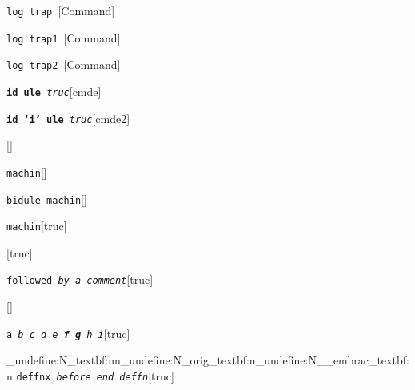 \documentclass{book}
\begin{document}
%
\noindent\texttt{log trap \EmbracOn{}\textnormal{\textsl{}}\EmbracOff{}}\hfill[Command]



%
\noindent\texttt{log trap1 \EmbracOn{}\textnormal{\textsl{}}\EmbracOff{}}\hfill[Command]



%
\noindent\texttt{log trap2 \EmbracOn{}\textnormal{\textsl{}}\EmbracOff{}}\hfill[Command]



%
\noindent\texttt{\textbf{id ule} \EmbracOn{}\textnormal{\textsl{truc}}\EmbracOff{}}\hfill[cmde]



%
\noindent\texttt{\textbf{id `\texttt{i}' ule} \EmbracOn{}\textnormal{\textsl{truc}}\EmbracOff{}}\hfill[cmde2]



%
\noindent\texttt{}\hfill[]



\noindent\texttt{machin}\hfill[]



%
\noindent\texttt{bidule machin}\hfill[]



%
\noindent\texttt{machin}\hfill[truc]



%
\noindent\texttt{}\hfill[truc]



\noindent\texttt{followed \EmbracOn{}\textnormal{\textsl{by a comment}}\EmbracOff{}}\hfill[truc]



%
\noindent\texttt{}\hfill[]



\noindent\texttt{a \EmbracOn{}\textnormal{\textsl{b c d e \textbf{f g} h i}}\EmbracOff{}}\hfill[truc]


\ExplSyntaxOn%
\cs_undefine:N{\embrac_textbf:nn}\cs_undefine:N{\embrac_orig_textbf:n}\cs_undefine:N{\__embrac_textbf:n}%
\ExplSyntaxOff%
%
\noindent\texttt{deffnx \EmbracOn{}\textnormal{\textsl{before end deffn}}\EmbracOff{}}\hfill[truc]
\end{document}
